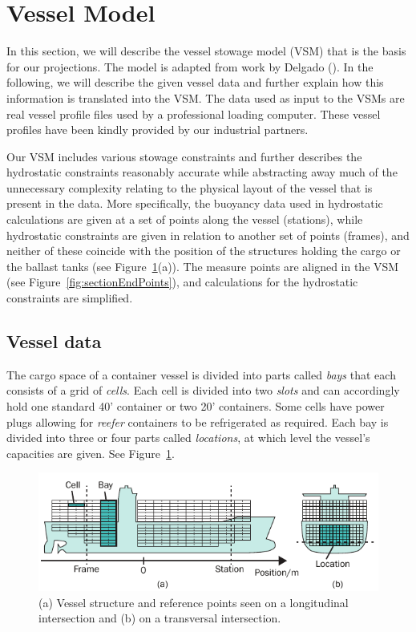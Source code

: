 %

%
\section{Vessel Model}\label{sec:VMs}
In this section, we will describe the vessel stowage model (VSM) that is the basis for our projections. The model is adapted from work by Delgado (\cite{AlbertosThesis}). In the following, we will describe the given vessel data and further explain how this information is translated into the VSM.
The data used as input to the VSMs are real vessel profile files used by a professional loading computer. These vessel profiles have been kindly provided by our industrial partners.

Our VSM includes various stowage constraints and further {describes the hydrostatic constraints reasonably accurate while}
abstracting away much of the unnecessary complexity relating to the physical layout of the vessel that is present in the data. 
More specifically, the buoyancy data used in hydrostatic calculations are given at a set of points along the vessel (stations), while hydrostatic constraints are given in relation to another set of points (frames), and neither of these coincide with the position of the structures holding the cargo or the ballast tanks (see Figure~\ref{fig:vessel}(a)). The measure points are aligned in the VSM (see Figure~\ref{fig:sectionEndPoints}), and calculations for the hydrostatic constraints are simplified.

\subsection{Vessel data}
The cargo space of a container vessel is divided into parts called \textit{bays} that each consists of a grid of \emph{cells}. Each cell is divided into two \emph{slots} and can accordingly hold one standard 40' container or two 20' containers. Some cells have power plugs allowing for \emph{reefer} containers to be refrigerated as required. Each bay is divided into three or four parts called \textit{locations}, at which level the vessel's capacities are given. See Figure~\ref{fig:vessel}.

\begin{figure}[hb]
	\centering
		\includegraphics{figures/vessel2.pdf}
	\caption{(a) Vessel structure and reference points seen on a longitudinal intersection and (b) on a transversal intersection.}
	\label{fig:vessel}
\end{figure}

